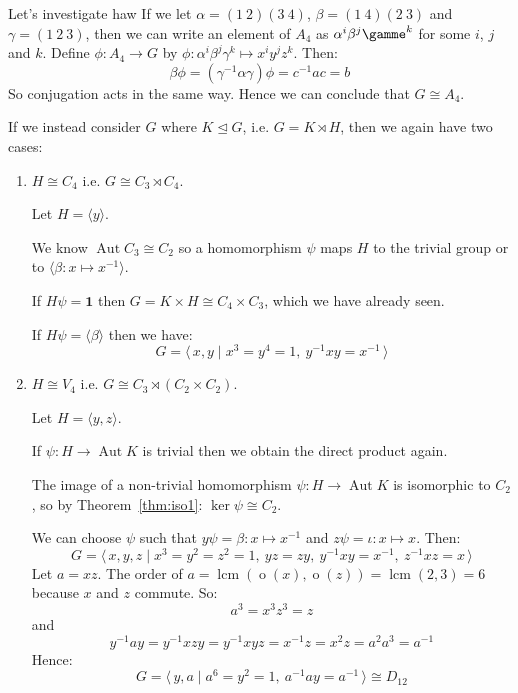 \documentclass[a4paper, oneside, 12pt, final]{article}
\theoremstyle{definition}
\DeclareMathOperator{\Aut}{Aut}
\DeclareMathOperator{\order}{o}
\DeclareMathOperator{\lcm}{lcm}
\newcommand{\nrmsgp}{\unlhd}
\begin{document}
\begin{enumerate}
        Let's investigate haw
        If we let \(\alpha = (1\ 2)(3\ 4)\), \(\beta = (1\ 4)(2\ 3)\) and \(\gamma = (1\ 2\ 3)\), then we can write an
        element of \(A_4\) as \(\alpha^i\beta^j\gamme^k\) for some \(i\), \(j\) and \(k\).
        Define \(\phi:A_4 \to G\) by \(\phi:\alpha^i\beta^j\gamma^k \mapsto x^{i}y^{j}z^{k}\).
        Then:
        \[\beta\phi = (\gamma^{-1}\alpha\gamma)\phi = c^{-1}ac = b\]
        So conjugation acts in the same way.
        Hence we can conclude that \(G \cong A_4\).
\end{enumerate}

If we instead consider \(G\) where \(K \nrmsgp G\), i.e. \(G = K \rtimes H\), then we again have two cases:

\begin{enumerate}
    \item \(H \cong C_4\) i.e. \(G \cong C_3 \rtimes C_4\).

        Let \(H = \langle y \rangle\).

        We know \(\Aut{C_3} \cong C_2\) so a homomorphism \(\psi\) maps \(H\) to the trivial group or to \(\langle
        \beta:x \mapsto x^{-1} \rangle\).

        If \(H\psi = \bm{1}\) then \(G = K \times H \cong C_4 \times C_3\), which we have already seen.

        If \(H\psi = \langle \beta \rangle\) then we have:
        \[G = \langle\, x, y \mid x^3 = y^4 = 1,\ y^{-1}xy = x^{-1}\,\rangle\]

    \item \(H \cong V_4\) i.e. \(G \cong C_3 \rtimes (C_2 \times C_2)\).

        Let \(H = \langle y, z \rangle\).

        If \(\psi:H \to \Aut{K}\) is trivial then we obtain the direct product again.

        The image of a non-trivial homomorphism \(\psi:H \to \Aut{K}\) is isomorphic to \(C_2\), so by
        Theorem~\ref{thm:iso1}: \(\ker{\psi} \cong C_2\).

        We can choose \(\psi\) such that \(y\psi = \beta:x \mapsto x^{-1}\) and \(z\psi = \iota:x \mapsto x\).
        Then:
        \[G = \langle\, x, y, z \mid x^3 = y^2 = z^2 = 1,\ yz = zy,\ y^{-1}xy = x^{-1},\ z^{-1}xz = x\,\rangle\]
        Let \(a = xz\).
        The order of \(a = \lcm{(\order{(x)}, \order{(z)})} = \lcm{(2, 3)} = 6\) because \(x\) and \(z\) commute.
        So:
        \[a^3 = x^3z^3 = z\]
        and
        \[ y^{-1}ay = y^{-1}xzy = y^{-1}xyz = x^{-1}z = x^2z = a^2a^3 = a^{-1}\]
        Hence:
        \[G = \langle\, y, a \mid a^6 = y^2 = 1,\ a^{-1}ay = a^{-1}\,\rangle
        \cong D_{12}\]
\end{enumerate}
\end{document}
